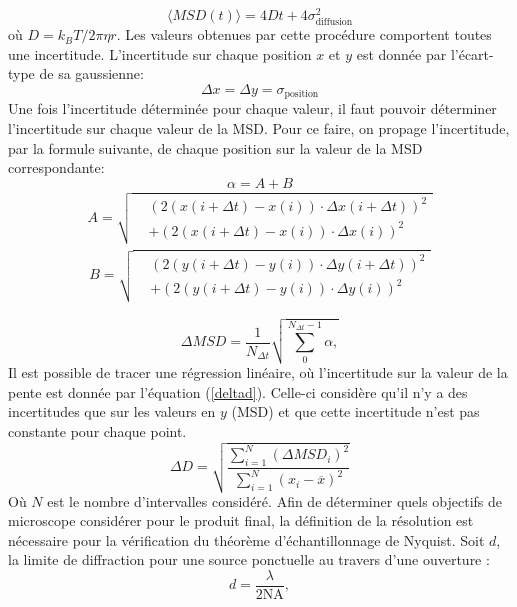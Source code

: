 \documentclass[conference]{IEEEtran}
\begin{document}
\begin{equation}
  \langle MSD(t) \rangle = 4Dt + 4\sigma_{\text{diffusion}}^{2}
\end{equation}
où $D=k_{B}T/2\pi \eta r$.
Les valeurs obtenues par cette procédure comportent toutes une incertitude. L'incertitude sur chaque 
position $x$ et $y$ est donnée par l'écart-type de sa gaussienne:
\begin{equation}
  \Delta x=\Delta y=\sigma_{\text{position}}
\end{equation}
Une fois l'incertitude déterminée pour chaque valeur, il faut pouvoir déterminer l'incertitude sur chaque valeur de la MSD. 
Pour ce faire, on propage l'incertitude, par la formule suivante, de chaque position sur la valeur de la MSD  correspondante: 
\begin{equation}
  \alpha =A+B
\end{equation}
\begin{align*}
  A = \sqrt{
    \begin{aligned}
      &\left( 2(x(i+\Delta t) - x(i))\cdot \Delta x(i+\Delta t) \right)^2 \\
      &+ \left( 2(x(i+\Delta t) - x(i))\cdot \Delta x(i) \right)^2
    \end{aligned}
  }
\end{align*}
\begin{align*}
  B = \sqrt{
    \begin{aligned}
      &\left( 2(y(i+\Delta t) - y(i))\cdot \Delta y(i+\Delta t) \right)^2 \\
      &+ \left( 2(y(i+\Delta t) - y(i))\cdot \Delta y(i) \right)^2
    \end{aligned}
  }
\end{align*}

\begin{equation}
  \Delta MSD=\frac{1}{N_{\Delta t}}\sqrt{\sum_{0}^{N_{\Delta t}-1}\alpha, }
\end{equation}
Il est possible de tracer une régression linéaire, où l'incertitude sur la valeur de la pente est donnée par l'équation (\ref{deltad}).
Celle-ci considère qu'il n'y a des incertitudes que sur les valeurs en $y$ (MSD) et que cette incertitude n'est pas constante pour chaque point.
\begin{equation}\label{deltad}
  \Delta D=\sqrt{\frac{\sum_{i=1}^{N}(\Delta MSD_{i})^{2}}{\sum_{i=1}^{N}{(x_{i}-\overline{x})^{2}}}}
\end{equation}
Où $N$ est le nombre d'intervalles considéré. Afin de déterminer quels objectifs de microscope considérer pour le produit final, la définition
de la résolution est nécessaire pour la vérification du théorème d'échantillonnage de Nyquist. Soit $d$,
la limite de diffraction pour une source ponctuelle au travers d'une ouverture \cite{video}:
\begin{equation}
  d = \frac{\lambda}{2 \text{NA}},
\end{equation}
\end{document}

